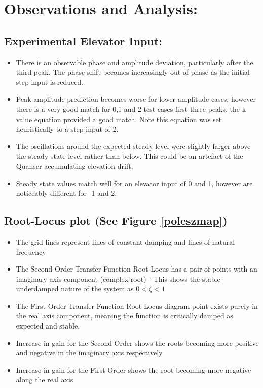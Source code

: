 \section{Observations and Analysis:}\label{observations-and-analysis}

\subsection{Experimental Elevator
Input:}\label{experimental-elevator-input}

\begin{itemize}
\tightlist
\item
  There is an observable phase and amplitude deviation, particularly
  after the third peak. The phase shift becomes increasingly out of
  phase as the initial step input is reduced.
\item
  Peak amplitude prediction becomes worse for lower amplitude cases,
  however there is a very good match for 0,1 and 2 test cases first
  three peaks, the k value equation provided a good match. Note this
  equation was set heuristically to a step input of 2.
\item
  The oscillations around the expected steady level were slightly larger
  above the steady state level rather than below. This could be an
  artefact of the Quanser accumulating elevation drift.
\item
  Steady state values match well for an elevator input of 0 and 1,
  however are noticeably different for -1 and 2.
\end{itemize}

\subsection{\texorpdfstring{Root-Locus plot (See Figure
\ref{poleszmap})}{Root-Locus plot (See Figure )}}\label{root-locus-plot-see-figure}

\begin{itemize}
\tightlist
\item
  The grid lines represent lines of constant damping and lines of
  natural frequency
\item
  The Second Order Transfer Function Root-Locus has a pair of points
  with an imaginary axis component (complex root) - This shows the
  stable underdamped nature of the system as \(0<\zeta<1\)
\item
  The First Order Transfer Function Root-Locus diagram point exists
  purely in the real axis component, meaning the function is critically
  damped as expected and stable.
\item
  Increase in gain for the Second Order shows the roots becoming more
  positive and negative in the imaginary axis respectively
\item
  Increase in gain for the First Order shows the root becoming more
  negative along the real axis
\end{itemize}

